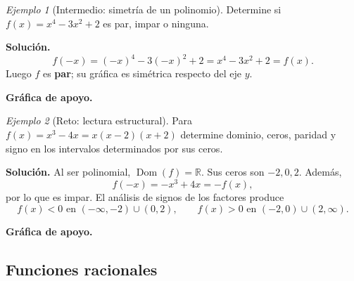 \documentclass[12pt]{article}
\theoremstyle{remark}
\newtheorem{ejemplo}{Ejemplo}[section]
\newcommand{\R}{\mathbb{R}}
\newcommand{\Dom}{\operatorname{Dom}}
\begin{document}
\begin{ejemplo}[Intermedio: simetría de un polinomio]
Determine si $f(x)=x^4-3x^2+2$ es par, impar o ninguna.

\textbf{Solución.}
\[
f(-x)=(-x)^4-3(-x)^2+2=x^4-3x^2+2=f(x).
\]
Luego $f$ es \textbf{par}; su gráfica es simétrica respecto del eje $y$.


\textbf{Gráfica de apoyo.}\medskip
\begin{center}
\end{center}

\end{ejemplo}

\begin{ejemplo}[Reto: lectura estructural]
Para $f(x)=x^3-4x=x(x-2)(x+2)$ determine dominio, ceros, paridad y signo en los intervalos determinados por sus ceros.

\textbf{Solución.} Al ser polinomial, $\Dom(f)=\R$. Sus ceros son $-2,0,2$. Además,
\[
f(-x)=-x^3+4x=-f(x),
\]
por lo que es impar. El análisis de signos de los factores produce
\[
f(x)<0\text{ en }(-\infty,-2)\cup(0,2),
\qquad
f(x)>0\text{ en }(-2,0)\cup(2,\infty).
\]


\textbf{Gráfica de apoyo.}\medskip
\begin{center}
\end{center}

\end{ejemplo}

\subsection{Funciones racionales}
\end{document}
